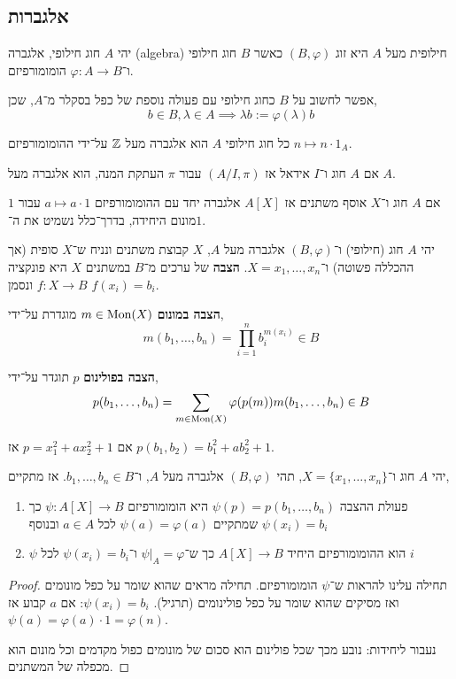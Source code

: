 \subsection{אלגברות}
\begin{definition}[אלגברה]
	יהי $A$ חוג חילופי, אלגברה (algebra) חילופית מעל $A$ היא זוג $(B, \varphi)$ כאשר $B$ חוג חילופי ו־$\varphi : A \to B$ הומומורפיזם.
\end{definition}
אפשר לחשוב על $B$ כחוג חילופי עם פעולה נוספת של כפל בסקלר מ־$A$, שכן,
\[
	b \in B, \lambda \in A
	\implies \lambda b := \varphi(\lambda) b
\]
\begin{example}
	כל חוג חילופי $A$ הוא אלגברה מעל $\mathbb{Z}$ על־ידי ההומומורפיזם $n \mapsto n \cdot 1_A$.
\end{example}
\begin{example}
	אם $A$ חוג ו־$I$ אידאל אז $(A / I, \pi)$ עבור $\pi$ העתקת המנה, הוא אלגברה מעל $A$.
\end{example}
\begin{example}
	אם $A$ חוג ו־$X$ אוסף משתנים אז $A[X]$ אלגברה יחד עם ההומומורפיזם $a \mapsto a \cdot 1$ עבור $1$ מונום היחידה, בדרך־כלל נשמיט את ה־$1$.
\end{example}
\begin{definition}
	יהי $A$ חוג (חילופי) ו־$(B, \varphi)$ אלגברה מעל $A$, $X$ קבוצת משתנים ונניח ש־$X$ סופית (אך ההכללה פשוטה) ו־$X = x_1, \ldots, x_n$.
	\textbf{הצבה} של ערכים מ־$B$ במשתנים $X$ היא פונקציה $f : X \to B$ ונסמן $f(x_i) = b_i$.

	\textbf{הצבה במונום} $m \in \operatorname{Mon}(X)$ מוגדרת על־ידי,
	\[
		m(b_1, \ldots, b_n)
		= \prod_{i = 1}^n b_i^{m(x_i)} \in B
	\]

	\textbf{הצבה בפולינום} $p$ תוגדר על־ידי,
	\[
		p(b_1, \ldots, b_n)
		= \sum_{m \in \operatorname{Mon}(X)} \varphi(p(m)) m(b_1, \ldots, b_n) \in B
	\]
\end{definition}
\begin{example}
	אם $p = x_1^2 + a x_2^2 + 1$ אז $p(b_1, b_2) = b_1^2 + a b_2^2 + 1$.
\end{example}
\begin{theorem}
	יהי $A$ חוג ו־$X = \{x_1, \ldots, x_n\}$, תהי $(B, \varphi)$ אלגברה מעל $A$, ו־$b_1, \ldots, b_n \in B$.
	אז מתקיים,
	\begin{enumerate}
		\item פעולת ההצבה $\psi(p) = p(b_1, \ldots, b_n)$ היא הומומורפיזם $\psi : A[X] \to B$ כך שמתקיים $\psi(a) = \varphi(a)$ לכל $a \in A$ ובנוסף $\psi(x_i) = b_i$
		\item $\psi$ הוא ההומומורפיזם היחיד $A[X] \to B$ כך ש־$\psi |_A = \varphi$ ו־$\psi(x_i) = b_i$ לכל $i$
	\end{enumerate}
\end{theorem}
\begin{proof}
	תחילה עלינו להראות ש־$\psi$ הומומורפיזם.
	תחילה מראים שהוא שומר על כפל מונומים ואז מסיקים שהוא שומר על כפל פולינומים (תרגיל).
	$\psi(x_i) = b_i$: אם $a$ קבוע אז $\psi(a) = \varphi(a) \cdot 1 = \varphi(n)$.

	נעבור ליחידות:
	נובע מכך שכל פולינום הוא סכום של מונומים כפול מקדמים וכל מונום הוא מכפלה של המשתנים.
\end{proof}

